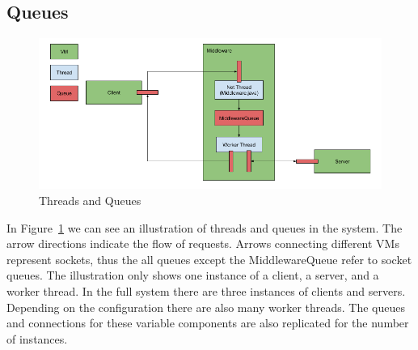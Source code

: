 \documentclass[11pt,a4paper]{article}
\begin{document}
\subsection{Queues}
%
\begin{figure}[H]
    \includegraphics[width=\linewidth]{../illustrations/threads_and_queues.png}
    \caption{Threads and Queues}
    \label{fig:threads_and_queues}
\end{figure}
%
In Figure~\ref{fig:threads_and_queues} we can see an illustration of threads and queues in the system.
%
The arrow directions indicate the flow of requests.
%
Arrows connecting different VMs represent sockets, thus the all queues except the MiddlewareQueue refer to socket queues.
%
The illustration only shows one instance of a client, a server, and a worker thread.
%
In the full system there are three instances of clients and servers.
%
Depending on the configuration there are also many worker threads.
%
The queues and connections for these variable components are also replicated for the number of instances.
%
\end{document}
